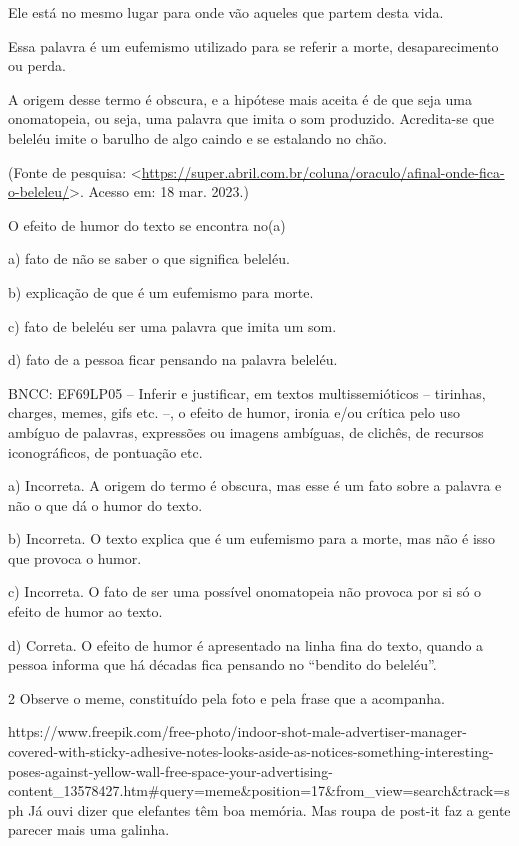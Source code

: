 {Ele está no mesmo lugar para onde vão aqueles que partem desta vida.

Essa palavra é um eufemismo utilizado para se referir a morte,
desaparecimento ou perda.

A origem desse termo é obscura, e a hipótese mais aceita é de que seja
uma onomatopeia, ou seja, uma palavra que imita o som produzido.
Acredita-se que beleléu imite o barulho de algo caindo e se estalando no
chão.

(Fonte de pesquisa:
\textless{}\url{https://super.abril.com.br/coluna/oraculo/afinal-onde-fica-o-beleleu/}\textgreater.
Acesso em: 18 mar. 2023.)

O efeito de humor do texto se encontra no(a)

a) fato de não se saber o que significa beleléu.

b) explicação de que é um eufemismo para morte.

c) fato de beleléu ser uma palavra que imita um som.

d) fato de a pessoa ficar pensando na palavra beleléu.

BNCC: EF69LP05 -- Inferir e justificar, em textos multissemióticos --
tirinhas, charges, memes, gifs etc. --, o efeito de humor, ironia e/ou
crítica pelo uso ambíguo de palavras, expressões ou imagens ambíguas, de
clichês, de recursos iconográficos, de pontuação etc.

a) Incorreta. A origem do termo é obscura, mas esse é um fato sobre a
palavra e não o que dá o humor do texto.

b) Incorreta. O texto explica que é um eufemismo para a morte, mas não é
isso que provoca o humor.

c) Incorreta. O fato de ser uma possível onomatopeia não provoca por si
só o efeito de humor ao texto.

d) Correta. O efeito de humor é apresentado na linha fina do texto,
quando a pessoa informa que há décadas fica pensando no ``bendito do
beleléu''.

\num{2} Observe o meme, constituído pela foto e pela frase que a
acompanha.

https://www.freepik.com/free-photo/indoor-shot-male-advertiser-manager-covered-with-sticky-adhesive-notes-looks-aside-as-notices-something-interesting-poses-against-yellow-wall-free-space-your-advertising-content\_13578427.htm\#query=meme\&position=17\&from\_view=search\&track=sph
Já ouvi dizer que elefantes têm boa memória. Mas roupa de post-it faz a
gente parecer mais uma galinha.

}
